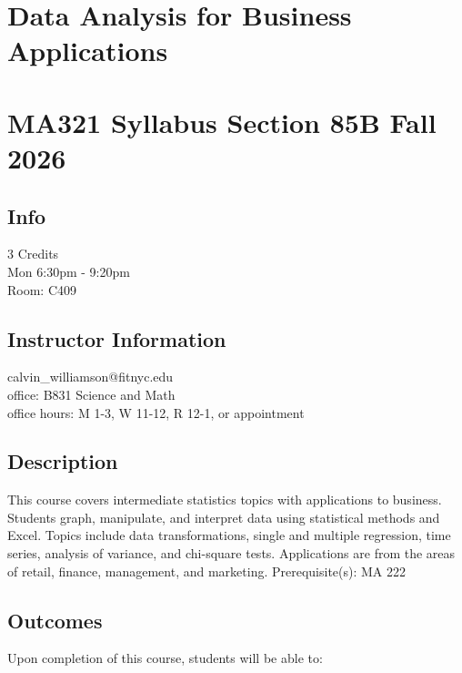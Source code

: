 \documentclass[
  letterpaper,
  DIV=11,
  numbers=noendperiod]{scrartcl}
\author{}
\date{}
\begin{document}
\section{Data Analysis for Business
Applications}\label{data-analysis-for-business-applications}

\section{MA321 Syllabus Section 85B Fall
2026}\label{ma321-syllabus-section-85b-fall-2026}

\subsection{Info}\label{info}

3 Credits\\
Mon 6:30pm - 9:20pm\\
Room: C409

\subsection{Instructor Information}\label{instructor-information}

calvin\_williamson@fitnyc.edu\\
office: B831 Science and Math\\
office hours: M 1-3, W 11-12, R 12-1, or appointment

\subsection{Description}\label{description}

This course covers intermediate statistics topics with applications to
business. Students graph, manipulate, and interpret data using
statistical methods and Excel. Topics include data transformations,
single and multiple regression, time series, analysis of variance, and
chi-square tests. Applications are from the areas of retail, finance,
management, and marketing. Prerequisite(s): MA 222

\subsection{Outcomes}\label{outcomes}

Upon completion of this course, students will be able to:
\end{document}
